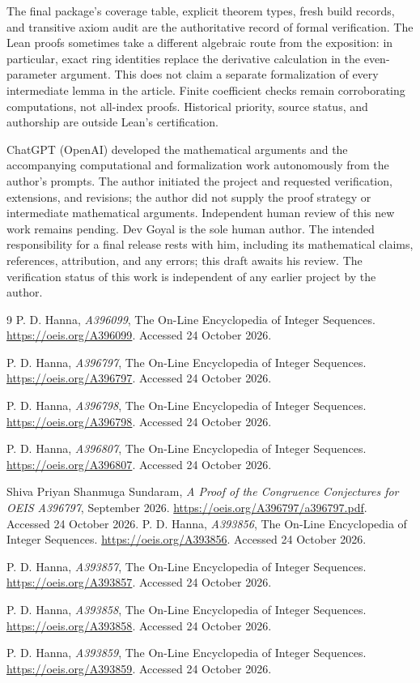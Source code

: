 \documentclass[11pt,a4paper]{article}
\theoremstyle{remark}
\begin{document}
The final package's coverage table, explicit theorem types, fresh
build records, and transitive axiom audit are the authoritative
record of formal verification. The Lean proofs sometimes take a
different algebraic route from the exposition: in particular,
exact ring identities replace the derivative calculation in the
even-parameter argument. This does not claim a separate formalization
of every intermediate lemma in the article. Finite coefficient
checks remain corroborating computations, not all-index proofs.
Historical priority, source status, and authorship are outside
Lean's certification.

ChatGPT (OpenAI) developed the mathematical arguments and the
accompanying computational and formalization work autonomously from
the author's prompts. The author initiated the project and requested
verification, extensions, and revisions; the author did not supply
the proof strategy or intermediate mathematical arguments.
Independent human review of this new work remains pending. Dev Goyal
is the sole human author. The intended responsibility for a final
release rests with him, including its mathematical claims,
references, attribution, and any errors; this draft awaits his
review. The verification status of this work is independent of any
earlier project by the author.

\begin{thebibliography}{9}
P. D. Hanna, \emph{A396099}, The On-Line Encyclopedia of Integer
Sequences. \url{https://oeis.org/A396099}. Accessed 24 October 2026.

P. D. Hanna, \emph{A396797}, The On-Line Encyclopedia of Integer
Sequences. \url{https://oeis.org/A396797}. Accessed 24 October 2026.

P. D. Hanna, \emph{A396798}, The On-Line Encyclopedia of Integer
Sequences. \url{https://oeis.org/A396798}. Accessed 24 October 2026.

P. D. Hanna, \emph{A396807}, The On-Line Encyclopedia of Integer
Sequences. \url{https://oeis.org/A396807}. Accessed 24 October 2026.

Shiva Priyan Shanmuga Sundaram, \emph{A Proof of the Congruence Conjectures
for OEIS A396797}, September 2026.
\url{https://oeis.org/A396797/a396797.pdf}.
Accessed 24 October 2026.
P. D. Hanna, \emph{A393856}, The On-Line Encyclopedia of Integer
Sequences. \url{https://oeis.org/A393856}. Accessed 24 October 2026.

P. D. Hanna, \emph{A393857}, The On-Line Encyclopedia of Integer
Sequences. \url{https://oeis.org/A393857}. Accessed 24 October 2026.

P. D. Hanna, \emph{A393858}, The On-Line Encyclopedia of Integer
Sequences. \url{https://oeis.org/A393858}. Accessed 24 October 2026.

P. D. Hanna, \emph{A393859}, The On-Line Encyclopedia of Integer
Sequences. \url{https://oeis.org/A393859}. Accessed 24 October 2026.
\end{thebibliography}
\end{document}
